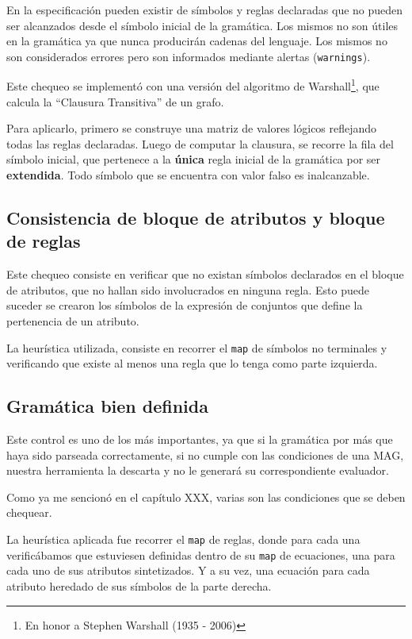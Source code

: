 En la especificación pueden existir de símbolos y reglas declaradas que no pueden ser alcanzados desde el símbolo inicial de la gramática. Los mismos no son útiles en la gramática ya que nunca producirán cadenas del lenguaje. Los mismos no son considerados errores pero son informados mediante alertas (\texttt{warnings}).

Este chequeo se implementó con una versión del algoritmo de Warshall\footnote{En honor a Stephen Warshall (1935 - 2006)}, que calcula la ``Clausura Transitiva'' de un grafo.

Para aplicarlo, primero se construye una matriz de valores lógicos reflejando todas las reglas declaradas. Luego de computar la clausura, se recorre la fila del símbolo inicial, que pertenece a la \textbf{única} regla inicial de la gramática por ser \textbf{extendida}. Todo símbolo que se encuentra con valor falso es inalcanzable.

\subsection{Consistencia de bloque de atributos y bloque de reglas}

Este chequeo consiste en verificar que no existan símbolos declarados en el bloque de atributos, que no hallan sido involucrados en ninguna regla. Esto puede suceder se crearon los símbolos de la expresión de conjuntos que define la pertenencia de un atributo.

La heurística utilizada, consiste en recorrer el \texttt{map} de símbolos no terminales y verificando que existe al menos una regla que lo tenga como parte izquierda.

\subsection{Gramática bien definida}

Este control es uno de los más importantes, ya que si la gramática por más que haya sido parseada correctamente, si no cumple con las condiciones de una MAG, nuestra herramienta la descarta y no le generará su correspondiente evaluador.

Como ya me sencionó en el capítulo XXX, varias son las condiciones que se deben chequear.

La heurística aplicada fue recorrer el \texttt{map} de reglas, donde para cada una verificábamos que estuviesen definidas dentro de su \texttt{map} de ecuaciones, una para cada uno de sus atributos sintetizados. Y a su vez, una ecuación para cada atributo heredado de sus símbolos de la parte derecha.

